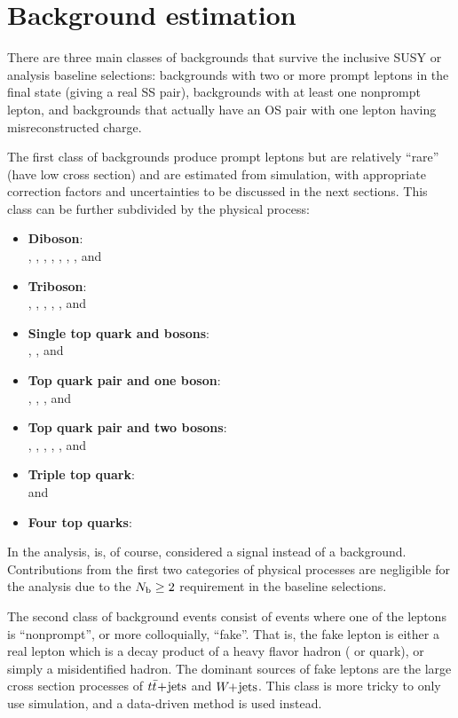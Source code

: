 \chapter{Background estimation}

There are three main classes of backgrounds that survive the inclusive SUSY or
\smft analysis baseline selections: backgrounds with two or more prompt leptons
in the final state (giving a real SS pair), backgrounds with at least one nonprompt lepton,
and backgrounds that actually have an OS pair with one lepton having misreconstructed charge.

The first class of backgrounds produce prompt leptons
but are relatively ``rare'' (have low cross section) and are estimated from
simulation, with appropriate correction factors and uncertainties to be discussed in the next
sections. This class can be further subdivided by the physical process:

\begin{itemize}
    \item \textbf{Diboson}: \\ \WZ, \ZZ, \WW, \WH, \ZH, \Zgamma, \Wgamma, and \WpWp
    \item \textbf{Triboson}: \\ \WWW, \WWZ, \WZZ, \ZZZ, \WWgamma, and \WZgamma
    \item \textbf{Single top quark and bosons}: \\ \tgamma, \tZgamma, and \tWZ
    \item \textbf{Top quark pair and one boson}: \\ \ttW, \ttZ, \ttH, and \ttgamma
    \item \textbf{Top quark pair and two bosons}: \\ \ttWW, \ttWZ, \ttZZ, \ttWH, \ttZH, and \ttHH
    \item \textbf{Triple top quark}: \\ \ttt and \tttW
    \item \textbf{Four top quarks}: \\ \tttt
\end{itemize}

In the \smft analysis, \tttt is, of course, considered a signal instead of a background.
Contributions from the first two categories of physical processes are negligible for the
\smft analysis due to the $N_\mathrm{b}\geq 2$ requirement in the baseline selections.

The second class of background events consist of events where one of the leptons is
``nonprompt'', or more colloquially, ``fake''. That is, the fake lepton is
either a real lepton which is a decay product of a heavy flavor hadron (\PQb 
or \PQc quark), or simply a misidentified hadron. The dominant sources of fake leptons
are the large cross section processes of $t\bar{t}\!+\!\mathrm{jets}$ and $W\!\!+\!\mathrm{jets}$. This class is more
tricky to only use simulation, and a data-driven method is used instead.

